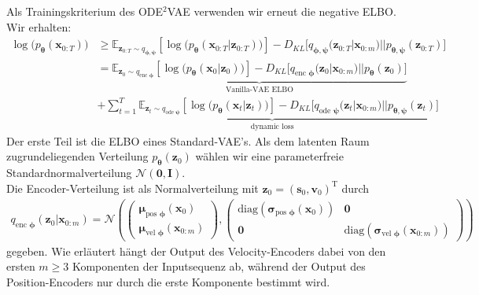 \documentclass[12pt]{article}
\newcommand{\E}{\mathbb{E}}
\begin{document}
	Als Trainingskriterium des ODE$^2$VAE verwenden wir erneut die negative ELBO.
	Wir erhalten:
	\begin{align*}
	\log\big(p_{\boldsymbol{\theta}}(\mathbf{x}_{0:T})\big)&\ge \E_{\mathbf{z}_{0:T}\sim q_{\boldsymbol\phi,\boldsymbol\psi}}
	\left[\log\big(p_{\boldsymbol\theta}\left(\mathbf{x}_{0:T}|\mathbf{z}_{0:T}\right)\big)\right] - D_{KL}\big[q_{\boldsymbol\phi,\boldsymbol\psi}(\mathbf{z}_{0:T}|\mathbf{x}_{0:m})||p_{\boldsymbol\theta,\boldsymbol\psi}(\mathbf{z}_{0:T})\big]\\
	&=\underbrace{\E_{\mathbf{z}_{0}\sim q_{\text{enc }\boldsymbol\phi}}
		\left[\log\big(p_{\boldsymbol\theta}\left(\mathbf{x}_{0}|\mathbf{z}_{0}\right)\big)\right] - D_{KL}\big[q_{\text{enc }\boldsymbol\phi}(\mathbf{z}_{0}|\mathbf{x}_{0:m})||p_{\boldsymbol\theta}(\mathbf{z}_{0})\big]}_{\text{Vanilla-VAE ELBO}}\\ &+ \underbrace{\sum_{t=1}^T \E_{\mathbf{z}_{t}\sim q_{\text{ode }\boldsymbol\psi}}
		\left[\log\big(p_{\boldsymbol\theta}\left(\mathbf{x}_{t}|\mathbf{z}_{t}\right)\big)\right] - D_{KL}\big[q_{\text{ode }\boldsymbol\psi}(\mathbf{z}_{t}|\mathbf{x}_{0:m})||p_{\boldsymbol\theta,\boldsymbol\psi}(\mathbf{z}_{t})\big]}_{\text{dynamic loss}}
	\end{align*}
	Der erste Teil ist die ELBO eines Standard-VAE's. %
	Als dem latenten Raum zugrundeliegenden Verteilung $p_{\boldsymbol\theta}(\mathbf{z}_{0})$ wählen wir eine parameterfreie Standardnormalverteilung $\mathcal{N}(\mathbf{0},\mathbf{I})$.\\
	Die Encoder-Verteilung ist als Normalverteilung mit $\mathbf{z}_{0} = (\mathbf{s}_{0},\mathbf{v}_{0})^{\mathrm{T}}$ durch
	\begin{align*}
	q_{\text{enc }\boldsymbol\phi}(\mathbf{z}_{0}|\mathbf{x}_{0:m}) =
	\mathcal{N}\left(\left(\begin{array}{cc}
	\boldsymbol\mu_{\text{pos }\boldsymbol\phi}(\textbf{x}_{0}) \\
	\boldsymbol\mu_{\text{vel }\boldsymbol\phi}(\textbf{x}_{0:m})
	\end{array}\right),\left(\begin{array}{cc}
	\text{diag}(\boldsymbol\sigma_{\text{pos }\boldsymbol\phi}(\textbf{x}_{0})) &
	\mathbf{0}\\
	\mathbf{0} &
	\text{diag}(\boldsymbol\sigma_{\text{vel }\boldsymbol\phi}(\textbf{x}_{0:m}))
	\end{array}\right)\right)
	\end{align*}
	gegeben. Wie erläutert hängt der Output des Velocity-Encoders dabei von den ersten $m\ge3$ Komponenten der Inputsequenz ab, während der Output des Position-Encoders nur durch die erste Komponente bestimmt wird.\\
\end{document}
